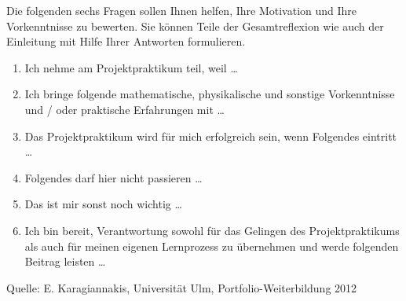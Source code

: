
Die folgenden sechs Fragen sollen Ihnen helfen, Ihre Motivation und Ihre Vorkenntnisse zu bewerten.
Sie k\"{o}nnen Teile der Gesamtreflexion wie auch der Einleitung mit Hilfe Ihrer Antworten formulieren.

\begin{enumerate}

\item Ich nehme am Projektpraktikum teil, weil \ldots


\item Ich bringe folgende mathematische, physikalische und sonstige Vorkenntnisse und / oder
praktische Erfahrungen mit \ldots


\item Das Projektpraktikum wird f\"{u}r mich erfolgreich sein, wenn Folgendes eintritt \ldots


\item Folgendes darf hier nicht passieren \ldots


\item Das ist mir sonst noch wichtig \ldots


\item Ich bin bereit, Verantwortung sowohl f\"{u}r das Gelingen des Projektpraktikums als auch f\"{u}r
meinen eigenen Lernprozess zu \"{u}bernehmen und werde folgenden Beitrag leisten \ldots


\end{enumerate}

Quelle: E. Karagiannakis, Universit\"{a}t Ulm, Portfolio-Weiterbildung 2012
